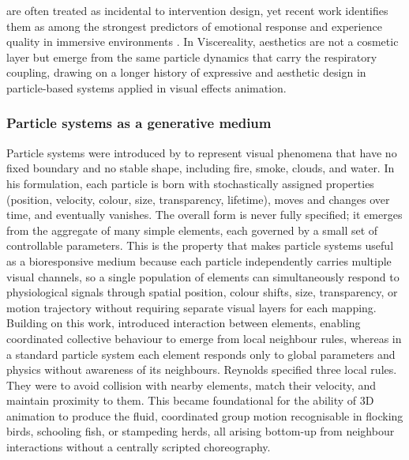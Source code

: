 are often treated as incidental to intervention design, yet recent work identifies them as among the strongest predictors of emotional response and experience quality in immersive environments \citep{Marcolin2021, Cheiran2025}. In Viscereality, aesthetics are not a cosmetic layer but emerge from the same particle dynamics that carry the respiratory coupling, drawing on a longer history of expressive and aesthetic design in particle-based systems applied in visual effects animation.

\subsubsection{Particle systems as a generative medium}
Particle systems were introduced by \citet{Reeves1983} to represent visual phenomena that have no fixed boundary and no stable shape, including fire, smoke, clouds, and water. In his formulation, each particle is born with stochastically assigned properties (position, velocity, colour, size, transparency, lifetime), moves and changes over time, and eventually vanishes. The overall form is never fully specified; it emerges from the aggregate of many simple elements, each governed by a small set of controllable parameters. This is the property that makes particle systems useful as a bioresponsive medium because each particle independently carries multiple visual channels, so a single population of elements can simultaneously respond to physiological signals through spatial position, colour shifts, size, transparency, or motion trajectory without requiring separate visual layers for each mapping. Building on this work, \citet{Reynolds1987} introduced interaction between elements, enabling coordinated collective behaviour to emerge from local neighbour rules, whereas in a standard particle system each element responds only to global parameters and physics without awareness of its neighbours. Reynolds specified three local rules. They were to avoid collision with nearby elements, match their velocity, and maintain proximity to them. This became foundational for the ability of 3D animation to produce the fluid, coordinated group motion recognisable in flocking birds, schooling fish, or stampeding herds, all arising bottom-up from neighbour interactions without a centrally scripted choreography.


